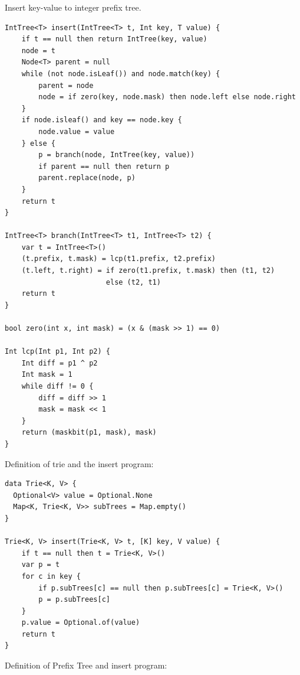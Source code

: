 \documentclass[b5paper]{article}
\begin{document}
Insert key-value to integer prefix tree.

\begin{lstlisting}[language = Bourbaki]
IntTree<T> insert(IntTree<T> t, Int key, T value) {
    if t == null then return IntTree(key, value)
    node = t
    Node<T> parent = null
    while (not node.isLeaf()) and node.match(key) {
        parent = node
        node = if zero(key, node.mask) then node.left else node.right
    }
    if node.isleaf() and key == node.key {
        node.value = value
    } else {
        p = branch(node, IntTree(key, value))
        if parent == null then return p
        parent.replace(node, p)
    }
    return t
}

IntTree<T> branch(IntTree<T> t1, IntTree<T> t2) {
    var t = IntTree<T>()
    (t.prefix, t.mask) = lcp(t1.prefix, t2.prefix)
    (t.left, t.right) = if zero(t1.prefix, t.mask) then (t1, t2)
                        else (t2, t1)
    return t
}

bool zero(int x, int mask) = (x & (mask >> 1) == 0)

Int lcp(Int p1, Int p2) {
    Int diff = p1 ^ p2
    Int mask = 1
    while diff != 0 {
        diff = diff >> 1
        mask = mask << 1
    }
    return (maskbit(p1, mask), mask)
}
\end{lstlisting}


Definition of trie and the insert program:

\begin{lstlisting}[language = Bourbaki]
data Trie<K, V> {
  Optional<V> value = Optional.None
  Map<K, Trie<K, V>> subTrees = Map.empty()
}

Trie<K, V> insert(Trie<K, V> t, [K] key, V value) {
    if t == null then t = Trie<K, V>()
    var p = t
    for c in key {
        if p.subTrees[c] == null then p.subTrees[c] = Trie<K, V>()
        p = p.subTrees[c]
    }
    p.value = Optional.of(value)
    return t
}
\end{lstlisting}

Definition of Prefix Tree and insert program:
\end{document}
